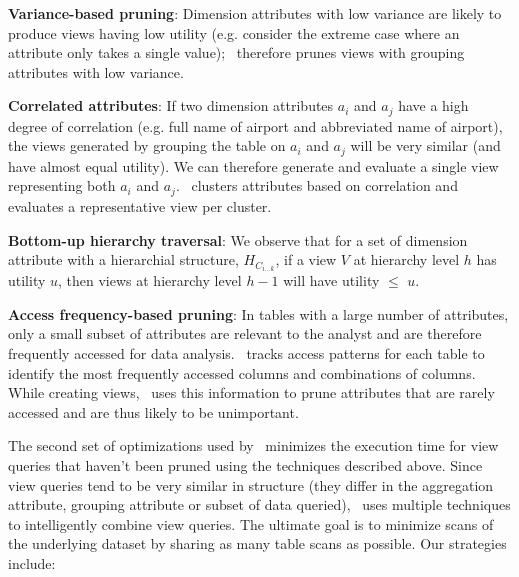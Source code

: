 \vspace{5 mm}

\squishlist
\item {\bf  Variance-based pruning}: Dimension attributes with low variance are
likely to produce views having low utility (e.g. consider the extreme case where
an attribute only takes a single value); \SeeDB\ therefore prunes views
with grouping attributes with low variance.
\item {\bf  Correlated attributes}: If two dimension attributes $a_i$ and $a_j$ have
a high degree of correlation (e.g. full name of airport and abbreviated name of
airport), the views generated by grouping the table on $a_i$ and $a_j$ will be
very similar (and have almost equal utility). We can therefore generate and
evaluate a single view representing both $a_i$ and $a_j$. \SeeDB\ clusters
attributes based on correlation and evaluates a representative view per
cluster.
\item {\bf  Bottom-up hierarchy traversal}: We observe that for a set of
  dimension attribute with a hierarchial structure, $H_{C_{i\ldots k}}$, if a
  view $V$ at hierarchy level $h$ has utility $u$, then views at hierarchy level
  $h-1$ will have utility $\leq$ $u$.
\item {\bf  Access frequency-based pruning}: In tables with a large number of
attributes, only a small subset of attributes are relevant to the analyst and
are therefore frequently accessed for data analysis. \SeeDB\ tracks access patterns
for each table to identify the most frequently accessed columns and combinations of
columns. While creating views, \SeeDB\ uses this information to prune attributes
that are rarely accessed and are thus likely to be unimportant.
\squishend

\vspace{5 mm}

The second set of optimizations used by \SeeDB\ minimizes the execution time for
view queries that haven't been pruned using the techniques described above.
Since view queries tend to be very similar in structure (they differ in the aggregation
attribute, grouping attribute or subset of data queried), \SeeDB\ uses multiple
techniques to intelligently combine view queries.
The ultimate goal is to minimize scans of the underlying dataset by sharing as
many table scans as possible. Our strategies include:

